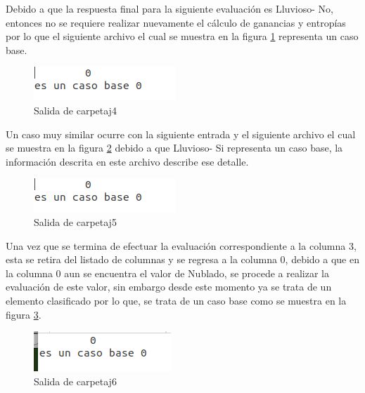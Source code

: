 Debido a que la respuesta final para la siguiente evaluación es Lluvioso- No, entonces no se requiere realizar nuevamente el cálculo de ganancias y entropías por lo que el siguiente archivo el cual se muestra en la figura \ref{fig:ID319} representa un caso base.
\begin{figure}[H]
	\begin{center}
		\hypertarget{fig:ID319}{\hspace{1pt}}
		\includegraphics[width=.3\textwidth]{capitulo4a/images/ID3_24.png}
		\caption{Salida de carpetaj4}
		\label{fig:ID319}
	\end{center}
\end{figure}
Un caso muy similar ocurre con la siguiente entrada y el siguiente archivo el cual se muestra en la figura \ref{fig:ID320} debido a que Lluvioso- Si representa un caso base, la información descrita en este archivo describe ese detalle. 
\begin{figure}[H]
	\begin{center}
		\hypertarget{fig:ID320}{\hspace{1pt}}
		\includegraphics[width=.3\textwidth]{capitulo4a/images/ID3_24.png}
		\caption{Salida de carpetaj5}
		\label{fig:ID320}
	\end{center}
\end{figure}
Una vez que se termina de efectuar la evaluación correspondiente a la columna 3, esta se retira del listado de columnas y se regresa a la columna 0, debido a que en la columna 0 aun se encuentra el valor de Nublado, se procede a realizar la evaluación de este valor, sin embargo desde este momento ya se trata de un elemento clasificado por lo que, se trata de un caso base como se muestra en la figura \ref{fig:ID321}.
 \begin{figure}[H]
 	\begin{center}
 		\hypertarget{fig:ID321}{\hspace{1pt}}
 		\includegraphics[width=.3\textwidth]{capitulo4a/images/ID3_27.png}
 		\caption{Salida de carpetaj6}
 		\label{fig:ID321}
 	\end{center}
 \end{figure}
